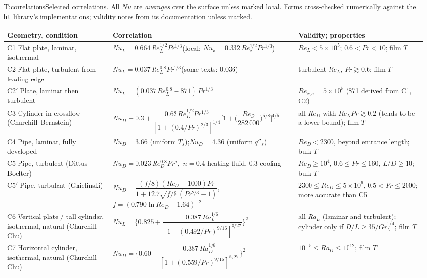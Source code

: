 \begin{reftab}{T:correlations}{Selected correlations. All $Nu$ are \emph{averages} over the surface unless marked local. Forms cross-checked numerically against the \texttt{ht} library's implementations; validity notes from its documentation unless marked.}
\small
\renewcommand{\arraystretch}{1.25}
\begin{tabularx}{\textwidth}{@{}L{0.21\textwidth}L{0.42\textwidth}Y@{}}
\toprule
Geometry, condition & Correlation & Validity; properties\\
\midrule
C1 Flat plate, laminar, isothermal & $Nu_L=0.664\,Re_L^{1/2}Pr^{1/3}$\quad (local: $Nu_x=0.332\,Re_x^{1/2}Pr^{1/3}$) & $Re_L<5\times10^5$; $0.6<Pr<10$; film $T$\label{F:conv:plate-lam}\\
C2 Flat plate, turbulent from leading edge & $Nu_L=0.037\,Re_L^{0.8}Pr^{1/3}$\quad (some texts: 0.036) & turbulent $Re_L$, $Pr\gtrsim0.6$; film $T$\\
C2$'$ Plate, laminar then turbulent & $Nu_L=(0.037\,Re_L^{0.8}-871)\,Pr^{1/3}$ & $Re_{x,c}=5\times10^5$ (871 derived from C1, C2)\\
C3 Cylinder in crossflow (Churchill--Bernstein) & $Nu_D=0.3+\dfrac{0.62\,Re_D^{1/2}Pr^{1/3}}{[1+(0.4/Pr)^{2/3}]^{1/4}}\Big[1+\Big(\dfrac{Re_D}{282\,000}\Big)^{5/8}\Big]^{4/5}$ & all $Re_D$ with $Re_DPr\gtrsim0.2$ (tends to be a lower bound); film $T$\label{F:conv:cyl}\\
C4 Pipe, laminar, fully developed & $Nu_D=3.66$ (uniform $T_s$);\quad $Nu_D=4.36$ (uniform $q''_s$) & $Re_D<2300$, beyond entrance length; bulk $T$\\
C5 Pipe, turbulent (Dittus--Boelter) & $Nu_D=0.023\,Re_D^{0.8}Pr^{n}$,\ $n=0.4$ heating fluid, $0.3$ cooling & $Re_D\ge10^4$, $0.6\le Pr\le160$, $L/D\ge10$; bulk $T$\label{F:conv:db}\\
C5$'$ Pipe, turbulent (Gnielinski) & $Nu_D=\dfrac{(f/8)(Re_D-1000)Pr}{1+12.7\sqrt{f/8}\,(Pr^{2/3}-1)}$,\ $f=(0.790\ln Re_D-1.64)^{-2}$ & $2300\le Re_D\le5\times10^6$, $0.5<Pr\le2000$; more accurate than C5\\
C6 Vertical plate / tall cylinder, isothermal, natural (Churchill--Chu) & $Nu_L=\Big\{0.825+\dfrac{0.387\,Ra_L^{1/6}}{[1+(0.492/Pr)^{9/16}]^{8/27}}\Big\}^2$ & all $Ra_L$ (laminar and turbulent); cylinder only if $D/L\ge35/Gr_L^{1/4}$; film $T$\label{F:conv:vert}\\
C7 Horizontal cylinder, isothermal, natural (Churchill--Chu) & $Nu_D=\Big\{0.60+\dfrac{0.387\,Ra_D^{1/6}}{[1+(0.559/Pr)^{9/16}]^{8/27}}\Big\}^2$ & $10^{-5}\le Ra_D\le10^{12}$; film $T$\label{F:conv:hcyl}\\

\end{tabularx}
\end{reftab}
